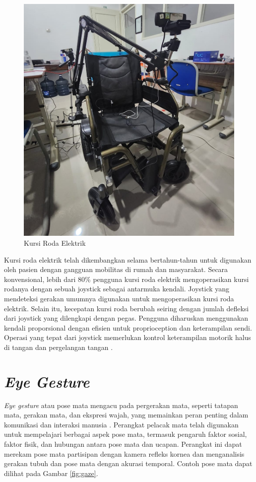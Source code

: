 \begin{figure}[H]
  \centering

  \includegraphics[width=.47\textwidth]{gambar/bab3/wheel.jpeg}

  \caption{Kursi Roda Elektrik}
  \label{fig:kursiroda}
\end{figure}

Kursi roda elektrik telah dikembangkan selama bertahun-tahun untuk digunakan oleh pasien dengan gangguan mobilitas di rumah dan masyarakat. Secara konvensional, lebih dari 80\% pengguna kursi roda elektrik mengoperasikan kursi rodanya dengan sebuah joystick sebagai antarmuka kendali. Joystick yang mendeteksi gerakan umumnya digunakan untuk mengoperasikan kursi roda elektrik. Selain itu, kecepatan kursi roda berubah seiring dengan jumlah defleksi dari joystick yang dilengkapi dengan pegas. Pengguna diharuskan menggunakan kendali proporsional dengan efisien untuk proprioception dan keterampilan sendi. Operasi yang tepat dari joystick memerlukan kontrol keterampilan motorik halus di tangan dan pergelangan tangan \parencite{koyama23}.



\section{\emph{Eye Gesture}}

\textit{Eye gesture} atau pose mata mengacu pada pergerakan mata, seperti tatapan mata, gerakan mata, dan ekspresi wajah, yang memainkan peran penting dalam komunikasi dan interaksi manusia \parencite{vanni_2022}. Perangkat pelacak mata telah digunakan untuk mempelajari berbagai aspek pose mata, termasuk pengaruh faktor sosial, faktor fisik, dan hubungan antara pose mata dan ucapan. Perangkat ini dapat merekam pose mata partisipan dengan kamera refleks kornea dan menganalisis gerakan tubuh dan pose mata dengan akurasi temporal\parencite{gullberg_kita_2009}. Contoh pose mata dapat dilihat pada Gambar \ref{fig:gaze}.

